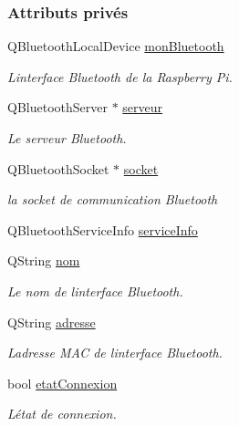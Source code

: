 \subsubsection*{Attributs privés}
\begin{DoxyCompactItemize}
\item 
Q\+Bluetooth\+Local\+Device \hyperlink{class_communication_bluetooth_abc0a9f1ce7a055021027ebc841154c9c}{mon\+Bluetooth}
\begin{DoxyCompactList}\small\item\em L\textquotesingle{}interface Bluetooth de la Raspberry Pi. \end{DoxyCompactList}\item 
Q\+Bluetooth\+Server $\ast$ \hyperlink{class_communication_bluetooth_ace7c3b582db4257a20eb873ebfdf368a}{serveur}
\begin{DoxyCompactList}\small\item\em Le serveur Bluetooth. \end{DoxyCompactList}\item 
Q\+Bluetooth\+Socket $\ast$ \hyperlink{class_communication_bluetooth_aa07c388515488b3d38d37f1518bfd9d2}{socket}
\begin{DoxyCompactList}\small\item\em la socket de communication Bluetooth \end{DoxyCompactList}\item 
Q\+Bluetooth\+Service\+Info \hyperlink{class_communication_bluetooth_a5ee2e50a8558ebb27b72a97343dabbf3}{service\+Info}
\item 
Q\+String \hyperlink{class_communication_bluetooth_a320cc60a0cb6b4ea9e009fef2853f1d2}{nom}
\begin{DoxyCompactList}\small\item\em Le nom de l\textquotesingle{}interface Bluetooth. \end{DoxyCompactList}\item 
Q\+String \hyperlink{class_communication_bluetooth_a20fd97fb70e36e0dfb8dadcc25484302}{adresse}
\begin{DoxyCompactList}\small\item\em L\textquotesingle{}adresse M\+AC de l\textquotesingle{}interface Bluetooth. \end{DoxyCompactList}\item 
bool \hyperlink{class_communication_bluetooth_ae6ab740d6e6673fcc9a9f141bd295bc4}{etat\+Connexion}
\begin{DoxyCompactList}\small\item\em L\textquotesingle{}état de connexion. \end{DoxyCompactList}\item 

\end{DoxyCompactItemize}
